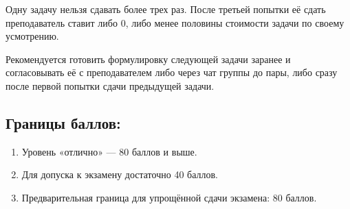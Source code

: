 \documentclass[a4paper,12pt]{article}
\begin{document}
Одну задачу нельзя сдавать более трех раз. После третьей попытки её сдать преподаватель ставит либо 0, либо менее половины стоимости задачи по своему усмотрению.

Рекомендуется готовить формулировку следующей задачи заранее и согласовывать её с преподавателем либо через чат группы до пары, либо сразу после первой попытки сдачи предыдущей задачи.

\subsection*{Границы баллов:}
\begin{enumerate}
    \item Уровень «отлично» — 80 баллов и выше.
    \item Для допуска к экзамену достаточно 40 баллов.
    \item Предварительная граница для упрощённой сдачи экзамена: 80 баллов.
\end{enumerate}
\end{document}
